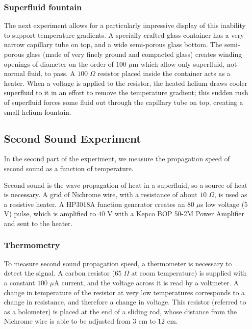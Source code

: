 \subsubsection{Superfluid fountain}\label{superfluidfountain}

The next experiment allows for a particularly impressive display of this inability to support temperature gradients. A specially crafted glass container has a very narrow capillary tube on top, and a wide semi-porous glass bottom. The semi-porous glass (made of very finely ground and compacted glass) creates winding openings of diameter on the order of $100$ $\mu$m which allow only superfluid, not normal fluid, to pass. A $100$ $\Omega$ resistor placed inside the container acts as a heater. When a voltage is applied to the resistor, the heated helium draws cooler superfluid to it in an effort to remove the temperature gradient; this sudden rush of superfluid forces some fluid out through the capillary tube on top, creating a small helium fountain.

\subsection{Second Sound Experiment}

In the second part of the experiment, we measure the propagation speed of second sound as a function of temperature.

Second sound is the wave propagation of heat in a superfluid, so a source of heat is necessary. A grid of Nichrome wire, with a resistance of about $10$ $\Omega$, is used as a resistive heater. A HP3018A function generator creates an $80$ $\mu$s low voltage ($5$ V) pulse, which is amplified to $40$ V with a Kepco BOP 50-2M Power Amplifier and sent to the heater. 

\subsubsection{Thermometry}
To measure second sound propagation speed, a thermometer is necessary
to detect the signal. A carbon resistor ($65$ $\Omega$ at room
temperature) is supplied with a constant $100$ $\mu$A current, and the
voltage across it is read by a voltmeter. A change in temperature of
the resistor at very low temperatures corresponds to a change in
resistance, and therefore a change in voltage. This resistor (referred
to as a bolometer) is placed at the end of a sliding rod, whose
distance from the Nichrome wire is able to be adjusted from $3$ cm to
$12$ cm.

